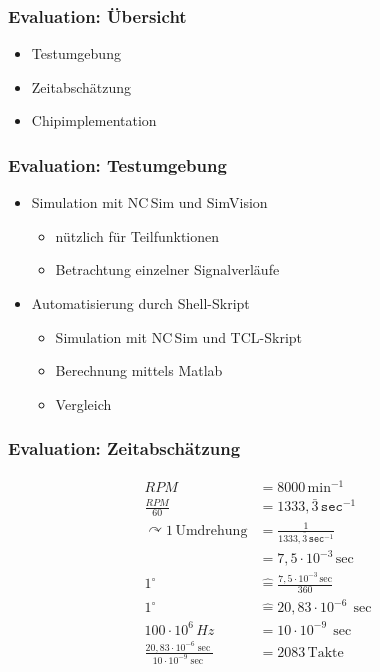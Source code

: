 \begin{frame}\frametitle{Evaluation: Übersicht}
 \begin{itemize}
  \item Testumgebung
  \item Zeitabschätzung
  \item Chipimplementation
 \end{itemize}

\end{frame}


\begin{frame}\frametitle{Evaluation: Testumgebung}
 \begin{itemize}
  \item Simulation mit NC\,Sim und SimVision
  \begin{itemize}
   \item nützlich für Teilfunktionen
   \item Betrachtung einzelner Signalverläufe
  \end{itemize}
  \item Automatisierung durch Shell-Skript
  \begin{itemize}
   \item Simulation mit NC\,Sim und TCL-Skript
   \item Berechnung mittels Matlab
   \item Vergleich
  \end{itemize}
 \end{itemize}
\end{frame}


\begin{frame}\frametitle{Evaluation: Zeitabschätzung}
 \begin{align*}
    \nonumber RPM &= 8000\, \textrm{min}^{-1}\\[10pt] 
    \frac{RPM}{60} &= 1333,\bar{3}\,\texttt{sec}^{-1}  \\[10pt]
    \nonumber \curvearrowright 1\, \textrm{Umdrehung} &= \frac{1}{1333,\bar{3}\,\texttt{sec}^{-1}} \\[10pt] 
    &= 7,5\cdot 10^{-3}\,\textrm{sec}\\[10pt]
    \nonumber 1^\circ &\widehat{=} \frac{7,5\cdot 10^{-3}\,\textrm{sec}}{360}\\[10pt]
    1^\circ & \widehat{=} 20,83\cdot10^{-6}\,\sec \\[10pt]
    \nonumber 100\cdot10^6\,Hz &= 10\cdot10^{-9}\,\sec \\[10pt]
    \frac{20,83\cdot10^{-6}\sec}{10\cdot10^{-9}\sec} &= 2083\, \textrm{Takte} \label{eq:Takte}
\end{align*}
\end{frame}


